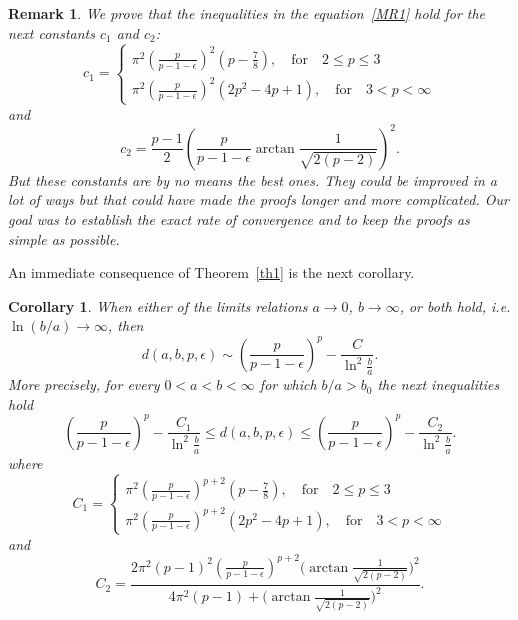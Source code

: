 \documentclass[10pt,a4paper]{amsart}
\newtheorem{cor}[theorem]{Corollary}
\newtheorem{remark}[theorem]{Remark}
\numberwithin{equation}{section}
\begin{document}
\begin{remark}
We prove that the inequalities in the equation~\ref{MR1} hold for the next constants $c_1$ and $c_2$:
\begin{equation*}\label{c1}
  c_1=
    \begin{cases}
          \pi^2\left(\frac{p}{p-1-\epsilon} \right)^2 \left(p-\frac{7}{8}\right), \quad\mbox{for}\quad 2\le p\le3\\
        \pi^2\left(\frac{p}{p-1-\epsilon} \right)^2   \left(2p^2-4p+1\right), \quad\mbox{for}\quad 3<p< \infty
        \end{cases}
 \end{equation*} 
 and
\begin{equation*}\label{c2}
c_2 =  \frac{p-1}{2}\left(\frac{p}{p-1-\epsilon}\arctan{\frac{1}{\sqrt{2(p-2)}}}\right)^2.
 \end{equation*} 
But these constants %
  are by no means the best ones. %
     They could be improved in a lot of ways but that could have made the proofs longer and more complicated.
Our goal was to establish the exact rate of convergence and to keep the proofs as simple as possible. 
\end{remark}
An immediate consequence of Theorem~\ref{th1} is the next corollary. 
\begin{cor}\label{cor1}
 When either of the limits relations $a\rightarrow0$,  $b\rightarrow\infty$, or both hold, i.e. $\ln(b/a)\rightarrow\infty$, then
\[
d(a,b,p,\epsilon) \sim 
\left(\frac{p}{p-1-\epsilon} \right)^p -\frac{C}{\ln^2 \frac{b}{a}}.
\]
More precisely, for every $0<a<b<\infty$ for which $b/a>b_0$ the next inequalities hold 
\begin{equation*}
\left(\frac{p}{p-1-\epsilon} \right)^p -\frac{C_1}{\ln^2 \frac{b}{a}} \le d(a,b,p,\epsilon) \le 
\left(\frac{p}{p-1-\epsilon} \right)^p -\frac{C_2}{\ln^2 \frac{b}{a}}.
\end{equation*}
where
\begin{equation*}
  C_1= 
    \begin{cases}
          \pi^2\left(\frac{p}{p-1-\epsilon} \right)^{p+2} \left(p-\frac{7}{8}\right), \quad\mbox{for}\quad 2\le p\le3\\
        \pi^2\left(\frac{p}{p-1-\epsilon} \right)^{p+2}  \left(2p^2-4p+1\right), \quad\mbox{for}\quad 3<p< \infty
        \end{cases}
 \end{equation*}
 and
\[
C_2 = \frac{2\pi^2(p-1)^2 \left(\frac{p}{p-1-\epsilon}\right)^{p+2}
\Big( \arctan{\frac{1}{\sqrt{2(p-2)}} }\Big)^2}{4\pi^2(p-1)+\Big( \arctan{\frac{1}{\sqrt{2(p-2)}} }\Big)^2}.
\]
\end{cor}
\end{document}
